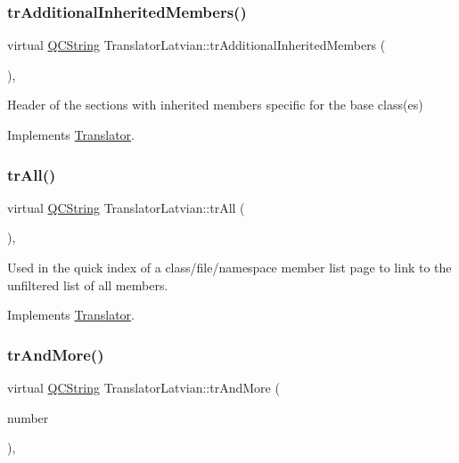 \subsubsection{\texorpdfstring{trAdditionalInheritedMembers()}{trAdditionalInheritedMembers()}}
{\footnotesize\ttfamily virtual \mbox{\hyperlink{class_q_c_string}{Q\+C\+String}} Translator\+Latvian\+::tr\+Additional\+Inherited\+Members (\begin{DoxyParamCaption}{ }\end{DoxyParamCaption})\hspace{0.3cm}{\ttfamily [inline]}, {\ttfamily [virtual]}}

Header of the sections with inherited members specific for the base class(es) 

Implements \mbox{\hyperlink{class_translator}{Translator}}.

\mbox{\label{class_translator_latvian_ab1c9c0c7e963a02e1d8678c0b63dcf4b}} 
\subsubsection{\texorpdfstring{trAll()}{trAll()}}
{\footnotesize\ttfamily virtual \mbox{\hyperlink{class_q_c_string}{Q\+C\+String}} Translator\+Latvian\+::tr\+All (\begin{DoxyParamCaption}{ }\end{DoxyParamCaption})\hspace{0.3cm}{\ttfamily [inline]}, {\ttfamily [virtual]}}

Used in the quick index of a class/file/namespace member list page to link to the unfiltered list of all members. 

Implements \mbox{\hyperlink{class_translator}{Translator}}.

\mbox{\label{class_translator_latvian_a4aecfc6ae33b8e484a44cd2cca747157}} 
\subsubsection{\texorpdfstring{trAndMore()}{trAndMore()}}
{\footnotesize\ttfamily virtual \mbox{\hyperlink{class_q_c_string}{Q\+C\+String}} Translator\+Latvian\+::tr\+And\+More (\begin{DoxyParamCaption}\item[{const \mbox{\hyperlink{class_q_c_string}{Q\+C\+String}} \&}]{number }\end{DoxyParamCaption})\hspace{0.3cm}{\ttfamily [inline]}, {\ttfamily [virtual]}}

